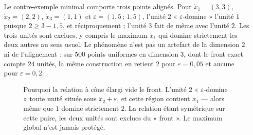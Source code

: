 \documentclass[11pt,a4paper]{article}
\theoremstyle{definition}
\theoremstyle{remark}
\begin{document}
\bigskip

Le contre-exemple minimal comporte trois points alignés. Pour
$\mathring{x}_1 = (3,3)$, $\mathring{x}_2 = (2,2)$, $\mathring{x}_3 = (1,1)$ et
$\varepsilon = (1{,}5\,;\,1{,}5)$, l'unité $2$ « $\varepsilon$-domine » l'unité $1$
puisque $2 \ge 3 - 1{,}5$, et réciproquement ; l'unité $3$ fait de même avec l'unité $2$.
Les trois unités sont exclues, y compris le maximum $\mathring{x}_1$ qui domine
strictement les deux autres au sens usuel. Le phénomène n'est pas un artefact de la
dimension $2$ ni de l'alignement : sur $500$ points uniformes en dimension $3$, dont le
front exact compte $24$ unités, la même construction en retient $2$ pour
$\varepsilon = 0{,}05$ et aucune pour $\varepsilon = 0{,}2$.

\medskip

\begin{figure}[htbp]
  \centering
  \caption{Pourquoi la relation à cône élargi vide le front. L'unité $2$
  « $\varepsilon$-domine » toute unité située sous $\mathring{x}_2 + \varepsilon$, et
  cette région contient $\mathring{x}_1$ --- alors même que $1$ domine strictement $2$.
  La relation étant symétrique sur cette paire, les deux unités sont exclues du
  « front ». Le maximum global n'est jamais protégé.}
  \label{fig:eps-contrexemple}
\end{figure}
\end{document}
